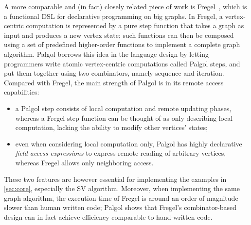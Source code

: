 \documentclass{sokendai_thesis} %
\begin{document}
A more comparable and (in fact) closely related piece of work is Fregel~\cite{fregel}, which is a functional DSL for declarative programming on big graphs.
In Fregel, a vertex-centric computation is represented by a pure step function that takes a graph as input and produces a new vertex state;
such functions can then be composed using a set of predefined higher-order functions to implement a complete graph algorithm.
Palgol borrows this idea in the language design by letting programmers write atomic vertex-centric computations called Palgol steps, and put them together using two combinators, namely sequence and iteration.
Compared with Fregel, the main strength of Palgol is in its remote access capabilities:
\begin{itemize}
 \item a Palgol step consists of local computation and remote updating phases, whereas a Fregel step function can be thought of as only describing local computation, lacking the ability to modify other vertices' states;
 \item even when considering local computation only, Palgol has highly declarative \textit{field access expressions} to express remote reading of arbitrary vertices, whereas Fregel allows only neighboring access.
\end{itemize}
These two features are however essential for implementing the examples in \autoref{sec:core}, especially the SV algorithm.
Moreover, when implementing the same graph algorithm, the execution time of Fregel is around an order of magnitude slower than human written code; Palgol shows that Fregel’s combinator-based design can in fact achieve efficiency comparable to hand-written code.
\end{document}
